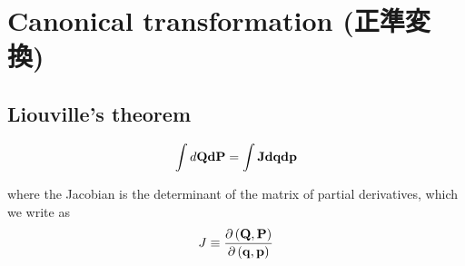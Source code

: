 \section{Canonical transformation (正準変換)}


\subsection{Liouville's theorem}
\begin{equation}
  \int d\bf{Q} d\bf{P} = \int J d\bf{q} d\bf{p}
\end{equation}

where the Jacobian is the determinant of the matrix of partial derivatives, which we write as
\begin{equation}
  J \equiv \frac{\partial \left( \bf{Q} , \bf{P} \right)}{\partial \left( \bf{q} , \bf{p} \right)}
\end{equation}
